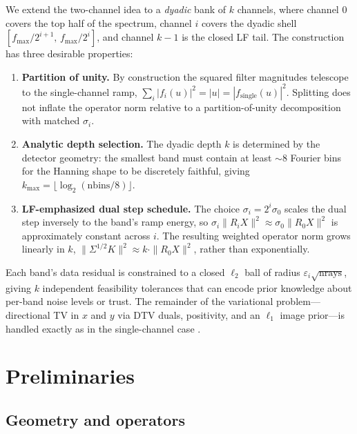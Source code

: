 \documentclass{article}
\newcommand{\eps}{\varepsilon}
\begin{document}
We extend the two-channel idea to a \emph{dyadic} bank of $k$ channels,
where channel $0$ covers the top half of the spectrum, channel $i$
covers the dyadic shell $[f_\text{max}/2^{i+1},\, f_\text{max}/2^i]$,
and channel $k-1$ is the closed LF tail. The construction has three
desirable properties:
\begin{enumerate}[leftmargin=*]
  \item \textbf{Partition of unity.} By construction the squared
    filter magnitudes telescope to the single-channel ramp,
    $\sum_i |f_i(u)|^2 = |u| = |f_\text{single}(u)|^2$. Splitting does
    not inflate the operator norm relative to a partition-of-unity
    decomposition with matched $\sigma_i$.
  \item \textbf{Analytic depth selection.} The dyadic depth $k$ is
    determined by the detector geometry: the smallest band must
    contain at least $\sim 8$ Fourier bins for the Hanning shape to
    be discretely faithful, giving $k_\text{max} = \lfloor \log_2(\text{nbins}/8) \rfloor$.
  \item \textbf{LF-emphasized dual step schedule.} The choice
    $\sigma_i = 2^i \sigma_0$ scales the dual step inversely to the
    band's ramp energy, so $\sigma_i \|R_i X\|^2 \approx \sigma_0 \|R_0 X\|^2$
    is approximately constant across $i$. The resulting weighted
    operator norm grows linearly in $k$, $\|\Sigma^{1/2} K\|^2 \approx k \cdot \|R_0 X\|^2$,
    rather than exponentially.
\end{enumerate}

Each band's data residual is constrained to a closed $\ell_2$ ball of
radius $\eps_i \sqrt{\text{nrays}}$, giving $k$ independent feasibility
tolerances that can encode prior knowledge about per-band noise levels
or trust. The remainder of the variational problem---directional
TV in $x$ and $y$ via DTV duals, positivity, and an $\ell_1$ image
prior---is handled exactly as in the single-channel case
\citep{rigie2015,kim2017}.

\section{Preliminaries}

\subsection{Geometry and operators}
\end{document}
